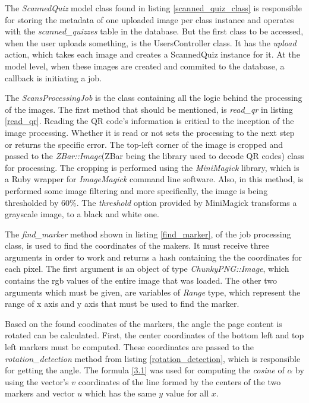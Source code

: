 The \textit{ScannedQuiz} model class found in listing \ref{scanned_quiz_class} is responsible for storing the metadata of one uploaded image per class instance and operates with the \textit{scanned\_quizzes} table in the database. But the first class to be accessed, when the user uploads something, is the UsersController class. It has the \textit{upload} action, which takes each image and creates a ScannedQuiz instance for it. At the model level, when these images are created and commited to the database, a callback is initiating a job. 



The \textit{ScansProcessingJob} is the class containing all the logic behind the processing of the images. The first method that should be mentioned, is \textit{read\_qr} in listing \ref{read_qr}. Reading the QR code's information is critical to the inception of the image processing. Whether it is read or not sets the processing to the next step or returns the specific error. The top-left corner of the image is cropped and passed to the \textit{ZBar::Image}(ZBar being the library used to decode QR codes) class for processing. The cropping is performed using the \textit{MiniMagick} library, which is a Ruby wrapper for \textit{ImageMagick} command line software. Also, in this method, is performed some image filtering and more specifically, the image is being thresholded by 60\%. The \textit{threshold} option provided by MiniMagick transforms a grayscale image, to a black and white one. 



The \textit{find\_marker} method shown in listing \ref{find_marker}, of the job processing class, is used to find the coordinates of the makers. It must receive three arguments in order to work and returns a hash containing the the coordinates for each pixel. The first argument is an object of type \textit{ChunkyPNG::Image}, which contains the rgb values of the entire image that was loaded. The other two arguments which must be given, are variables of \textit{Range} type, which represent the range of x axis and y axis that must be used to find the marker.  



Based on the found coodinates of the markers, the angle the page content is rotated can be calculated. First, the center coordinates of the bottom left and top left markers must be computed. These coordinates are passed to the \textit{rotation\_detection} method from listing \ref{rotation_detection}, which is responsible for getting the angle. The formula \ref{3.1} was used for computing the \textit{cosine} of $\alpha$ by using the vector's $v$ coordinates of the line formed by the centers of the two markers and vector $u$ which has the same $y$ value for all $x$.

